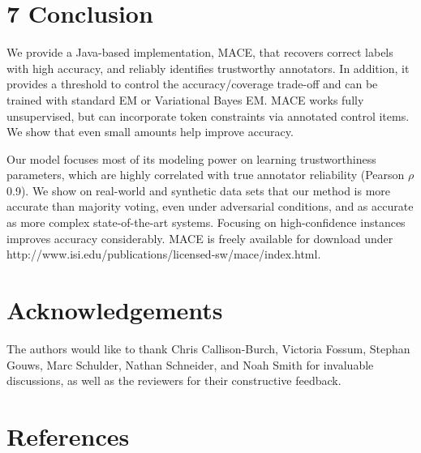 \documentclass[
]{article}
\begin{document}
\section{7 Conclusion}\label{conclusion}

We provide a Java-based implementation, MACE, that recovers correct
labels with high accuracy, and reliably identifies trustworthy
annotators. In addition, it provides a threshold to control the
accuracy/coverage trade-off and can be trained with standard EM or
Variational Bayes EM. MACE works fully unsupervised, but can incorporate
token constraints via annotated control items. We show that even small
amounts help improve accuracy.

Our model focuses most of its modeling power on learning trustworthiness
parameters, which are highly correlated with true annotator reliability
(Pearson \(\rho\) 0.9). We show on real-world and synthetic data sets
that our method is more accurate than majority voting, even under
adversarial conditions, and as accurate as more complex state-of-the-art
systems. Focusing on high-confidence instances improves accuracy
considerably. MACE is freely available for download under
http://www.isi.edu/publications/licensed-sw/mace/index.html.

\section{Acknowledgements}\label{acknowledgements}

The authors would like to thank Chris Callison-Burch, Victoria Fossum,
Stephan Gouws, Marc Schulder, Nathan Schneider, and Noah Smith for
invaluable discussions, as well as the reviewers for their constructive
feedback.

\section{References}\label{references}
\end{document}
